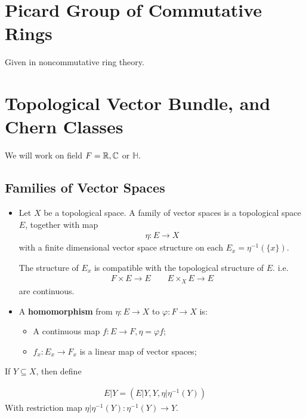 \documentclass[Total.tex]{subfiles}
\begin{document}
	\section{Picard Group of Commutative Rings}
	
	Given in noncommutative ring theory.
	
	\section{Topological Vector Bundle, and Chern Classes}
	
	We will work on field $F=\mathbb{R},\mathbb{C}$ or $\mathbb{H}$.
	
	\subsection{Families of Vector Spaces}
	
	\begin{Def}
		\begin{itemize}
			\item Let $X$ be a topological space. A family of vector spaces is a topological space $E$, together with map
			\begin{gather*}
				\eta:E\rightarrow X
			\end{gather*}
			with a finite dimensional vector space structure on each $E_x=\eta^{-1}(\{x\})$. 
			
			The structure of $E_x$ is compatible with the topological structure of $E$. i.e.
			\begin{gather*}
				F\times E\rightarrow E\qquad E\times_X E\rightarrow E
			\end{gather*}
			are continuous.
			
			\item  A \textbf{homomorphism} from $\eta:E\rightarrow X$ to $\varphi:F\rightarrow X$ is:
			
			\begin{itemize}
				\item A continuous map $f:E\rightarrow F,\eta=\varphi f$;
				\item $f_x:E_x\rightarrow F_x$ is a linear map of vector spaces;
			\end{itemize}
		\end{itemize}
	\end{Def}
	
	
	
	If $Y\subseteq X$, then define
	
	\begin{gather*}
		E|Y=(E|Y,Y,\eta|\eta^{-1}(Y))
	\end{gather*}
	With restriction map $\eta|\eta^{-1}(Y):\eta^{-1}(Y)\rightarrow Y$. 
	
\end{document}
